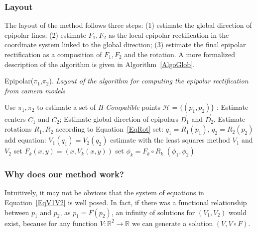\documentclass{ipol}
\newcommand{\RR}{\ensuremath{\mathbb{R}}}
\begin{document}


\subsubsection{Layout}

The layout of the method follows three steps: (1) estimate the global 
direction of epipolar lines; (2) estimate $F_1,F_2$ as  the local epipolar rectification
 in the coordinate system linked to the global direction; (3)  estimate the final
epipolar rectification as a composition of $F_1,F_2$ and the rotation.
A more formalized description of the algorithm is given in Algorithm~\ref{AlgoGlob}.


\begin{algorithm}[H]
\caption{Epipolar($\pi_1$,$\pi_2$). \emph{Layout of the algorithm for computing the epipolar rectification from camera models}}
\begin{algorithmic}
    \STATE Use $\pi_1,\pi_2$ to estimate a set of \emph{H-Compatible} points $\mathcal{H} =\{(p_1,p_2)\}$ : 
    \STATE Estimate centers $C_1$ and $C_2$;
    \STATE Estimate global direction of epipolars $\vec{D}_1$ and $\vec{D}_2$,
    \STATE Estimate rotations $R_1,R_2$ according to Equation~\eqref{EqRot}
              \STATE set: $q_1 = R_1(p_1)$,  $q_2 = R_2(p_2)$
              \STATE add equation: $V_1(q_1) = V_2(q_2)$
    \ENDFOR
    \STATE estimate with the least squares method $V_1$ and $V_2$
    \STATE set $F_k(x,y)=(x,V_k(x,y))$  %
    \STATE set $\phi_k =  F_k \circ  R_k $ %
    \RETURN $(\phi_1,\phi_2)$
\end{algorithmic}
\label{AlgoGlob}
\end{algorithm}



\subsubsection{Why does our method work?}
\label{WhyWork}

Intuitively, it may not be  obvious that the system of equations in Equation~\eqref{EqV1V2} is well posed.
In fact, if there was a functional relationship between
$p_1$ and $p_2$, as $p_1=F(p_2)$,  an infinity of solutions
for $(V_1,V_2)$ would exist, because   for any function $V: \RR^2 \rightarrow \RR $ we can generate a solution $(V,V\circ F)$.
\end{document}
